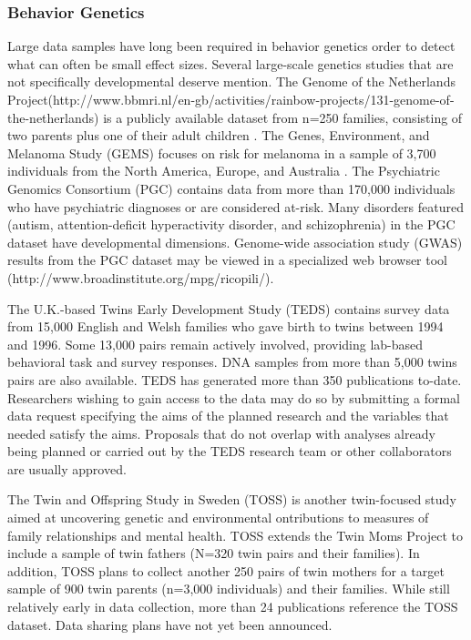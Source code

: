 \documentclass[letterpaper,man,apacite]{apa6}
\begin{document}
\subsubsection{Behavior Genetics}

Large data samples have long been required in behavior genetics order to detect what can often be small effect sizes.
Several large-scale genetics studies that are not specifically developmental deserve mention.
The Genome of the Netherlands Project(http://www.bbmri.nl/en-gb/activities/rainbow-projects/131-genome-of-the-netherlands) is a publicly available dataset from n=250 families, consisting of two parents plus one of their adult children \cite{Genome_Netherlands}.
The Genes, Environment, and Melanoma Study (GEMS) focuses on risk for melanoma in a sample of 3,700 individuals from the North America, Europe, and Australia \cite{GEMS}.
The Psychiatric Genomics Consortium (PGC) \cite{PGC} contains data from more than 170,000 individuals who have psychiatric diagnoses or are considered at-risk.
Many disorders featured (autism, attention-deficit hyperactivity disorder, and schizophrenia) in the PGC dataset have developmental dimensions.
Genome-wide association study (GWAS) results from the PGC dataset may be viewed in a specialized web browser tool (http://www.broadinstitute.org/mpg/ricopili/).

The U.K.-based Twins Early Development Study (TEDS) \cite{TEDS} contains survey data from 15,000 English and Welsh families who gave birth to twins between 1994 and 1996.
Some 13,000 pairs remain actively involved, providing lab-based behavioral task and survey responses.
DNA samples from more than 5,000 twins pairs are also available.
TEDS has generated more than 350 publications to-date.
Researchers wishing to gain access to the data may do so by submitting a formal data request specifying the aims of the planned research and the variables that needed satisfy the aims. 
Proposals that do not overlap with analyses already being planned or carried out by the TEDS research team or other collaborators are usually approved.

The Twin and Offspring Study in Sweden (TOSS) \cite{TOSS} is another twin-focused study aimed at uncovering genetic and environmental ontributions to measures of family relationships and mental health.
TOSS extends the Twin Moms Project to include a sample of twin fathers (N=320 twin pairs and their families).
In addition, TOSS plans to collect another 250 pairs of twin mothers for a target sample of 900 twin parents (n=3,000 individuals) and their families.
While still relatively early in data collection, more than 24 publications reference the TOSS dataset.
Data sharing plans have not yet been announced.
\end{document}
